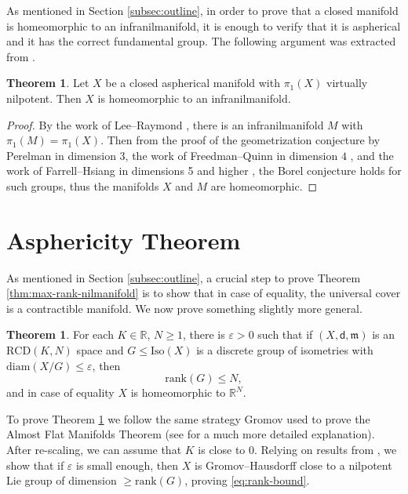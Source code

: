 \documentclass[12pt]{amsart}
\theoremstyle{definition}
\def\fnum{equation}
\newtheorem{theorem}[\fnum]{Theorem}
\numberwithin{equation}{section}
\newcommand{\rank}{{\text{rank}}}
\newcommand{\diam}{{\text {diam}}}
\newcommand{\iso}{\text{Iso}}
\newcommand{\rcd}{\text{RCD}}
\newcommand{\mm}{\mathfrak{m}}
\begin{document}
As mentioned in Section \ref{subsec:outline}, in order to prove that a closed manifold is homeomorphic to an infranilmanifold, it is enough to verify that it is aspherical and it has the correct fundamental group.   
The following argument was extracted from \cite{kapovitch}.

\begin{theorem}\label{thm:borel-nilpotent}
    Let $X$ be a closed aspherical manifold with $\pi_1(X)$ virtually nilpotent. Then $X$ is homeomorphic to an infranilmanifold.
\end{theorem}

\begin{proof}
    By  the work of Lee--Raymond \cite{lee-raymond}, there is an infranilmanifold $M$ with $\pi_1(M) = \pi_1(X)$. Then from the proof of the geometrization conjecture by Perelman in dimension $3$, the work of Freedman--Quinn in dimension $4$ \cite{freedman-quinn}, and the work of Farrell--Hsiang in dimensions 5 and higher \cite{farrell-hsiang}, the Borel conjecture holds for such groups, thus the manifolds $X$ and $M$ are homeomorphic.  
\end{proof}

\section{Asphericity Theorem}\label{sec:aspherical}


As mentioned in Section \ref{subsec:outline}, a crucial step to prove Theorem \ref{thm:max-rank-nilmanifold} is to show that in case of equality, the universal cover is a contractible manifold. We now prove something slightly more general.


\begin{theorem}\label{thm:contractible}
    For each $K \in \mathbb{R}$, $N \geq 1$, there is $\varepsilon > 0 $ such that if $(X, \mathsf{d} , \mm )$ is an $\rcd (K,N)$ space and $G \leq \iso (X)$ is a discrete group of isometries with $\diam (X/ G) \leq \varepsilon$, then 
    \begin{equation}\label{eq:rank-bound}
        \rank (G) \leq N,
    \end{equation}
    and in case of equality $X$ is homeomorphic to $\mathbb{R}^N$.  
\end{theorem}



To prove Theorem \ref{thm:contractible} we follow the same strategy Gromov used to prove the Almost Flat Manifolds Theorem \cite{gromov} (see  \cite{buser-karcher} for a much more detailed explanation). After re-scaling, we can assume that $K$ is close to $0$. Relying on results from \cite{breuillard-green-tao, zamora-limits}, we show that if $\varepsilon$ is small enough, then $X$ is Gromov--Hausdorff close to a nilpotent Lie group of dimension $\geq \rank (G)$, proving \eqref{eq:rank-bound}.
\end{document}
